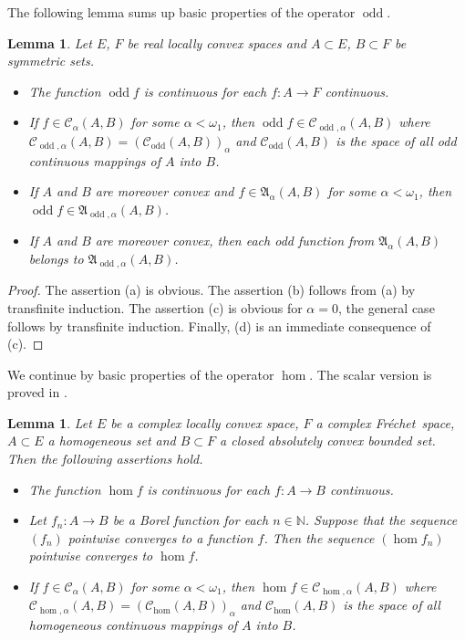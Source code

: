 \documentclass{amsart}
\numberwithin{equation}{section}
\newtheorem{lemma}[thm]{Lemma}
\theoremstyle{definition}
\def\fra{\mathfrak{A}}
\def\C{\mathcal C}
\def\en{\mathbb N}
\def\hom{\operatorname{hom}}
\def\odd{\operatorname{odd}}
\newcommand{\fr}{Fr\'echet\ }
\begin{document}
The following lemma sums up basic properties of the operator $\odd$.

\begin{lemma}\label{l:odd}
Let $E$, $F$ be real locally convex spaces and $A\subset E$, $B\subset F$ be symmetric sets.
\begin{itemize}
	\item[(a)] The function $\odd f$ is continuous for each $f:A\to F$ continuous.
	\item[(b)] If $f\in\C_\alpha(A,B)$ for some $\alpha<\omega_1$, then $\odd f\in\C_{\odd,\alpha}(A,B)$ where $\C_{\odd,\alpha}(A,B)=\left(\C_{\odd}(A,B)\right)_\alpha$ and $\C_{\odd}(A,B)$ is the space of all odd continuous mappings of $A$ into $B$.
		\item[(c)] If $A$ and $B$ are moreover convex and $f\in\fra_{\alpha}(A,B)$ for some $\alpha<\omega_1$, then $\odd f\in\fra_{\odd,\alpha}(A,B)$.
	\item[(d)] If $A$ and $B$ are moreover convex, then each odd function from $\fra_\alpha(A,B)$ belongs to $\fra_{\odd,\alpha}(A,B)$.
\end{itemize}
\end{lemma}

\begin{proof} The assertion (a) is obvious. The assertion (b) follows from (a) by transfinite induction.
The assertion (c) is obvious for $\alpha=0$, the general case follows by transfinite induction.
Finally, (d) is an immediate consequence of (c).
\end{proof}

We continue by basic properties of the operator $\hom$. The scalar version is proved in \cite[Lemma 2.2]{lusp-complex}.

\begin{lemma}
\label{l:hom}
Let $E$ be a complex locally convex space, $F$ a complex \fr space, $A\subset E$ a homogeneous set and $B\subset F$ a closed absolutely convex bounded set. Then the following assertions hold.
\begin{itemize}
\item [(a)] The function $\hom f$ is continuous for each $f:A\to B$ continuous.
\item [(b)] Let $f_n:A\to B$ be a Borel function for each $n\in\en$. Suppose that the sequence $(f_n)$ pointwise converges to a function $f$. Then the sequence $(\hom f_n)$ pointwise converges to $\hom f$.
\item [(c)] If $f\in\C_\alpha(A,B)$ for some $\alpha<\omega_1$, then $\hom f\in\C_{\hom,\alpha}(A,B)$  where $\C_{\hom,\alpha}(A,B)=\left(\C_{\hom}(A,B)\right)_\alpha$ and $\C_{\hom}(A,B)$ is the space of all homogeneous continuous mappings of $A$ into $B$.
\end{itemize}
\end{lemma}
\end{document}
